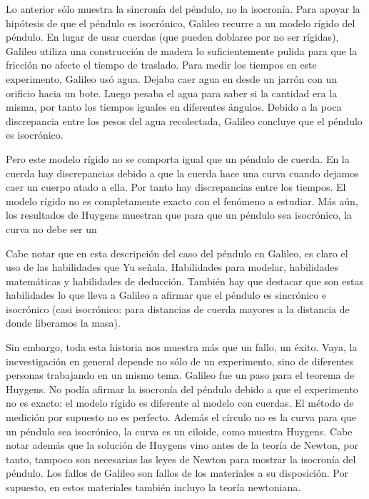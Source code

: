 Lo anterior sólo muestra la sincronía del péndulo, no la isocronía. Para apoyar la hipótesis de que el péndulo es isocrónico, Galileo recurre a un modelo rígido del péndulo. En lugar de usar cuerdas (que pueden doblarse por no ser rígidas), Galileo utiliza una construcción de madera lo suficientemente pulida para que la fricción no afecte el tiempo de traslado. Para medir los tiempos en este experimento, Galileo usó agua. Dejaba caer agua en desde un jarrón con un orificio hacia un bote. Luego pesaba el agua para saber si la cantidad era la misma, por tanto los tiempos iguales en diferentes ángulos. Debido a la poca discrepancia entre los pesos del agua recolectada, Galileo concluye que el péndulo es isocrónico.

Pero este modelo rígido no se comporta igual que un péndulo de cuerda. En la cuerda hay discrepancias debido a que la cuerda hace una curva cuando dejamos caer un cuerpo atado a ella. Por tanto hay discrepancias entre los tiempos. El modelo rígido no es completamente exacto con el fenómeno a estudiar. Más aún, los resultados de Huygens muestran que para que un péndulo sea isocrónico, la curva no debe ser un %

Cabe notar que en esta descripción del caso del péndulo en Galileo, es claro el uso de las habilidades que Yu señala. Habilidades para modelar, habilidades matemáticas y habilidades de deducción. También hay que destacar que son estas habilidades lo que lleva a Galileo a afirmar que el péndulo es sincrónico e isocrónico (casi isocrónico: para distancias de cuerda mayores a la distancia de donde liberamos la masa).

Sin embargo, toda esta historia nos muestra más que un fallo, un éxito. Vaya, la incvestigación en general depende no sólo de un experimento, sino de diferentes personas trabajando en un mismo tema. Galileo fue un paso para el teorema de Huygens. No podía afirmar la isocronía del péndulo debido a que el experimento no es exacto: el modelo rígido es diferente al modelo con cuerdas. El método de medición por supuesto no es perfecto. Además el círculo no es la curva para que un péndulo sea isocrónico, la curva es un ciloide, como muestra Huygens. Cabe notar además que la solución de Huygens vino antes de la teoría de Newton, por tanto, tampoco son necesarias las leyes de Newton para mostrar la isocronía del péndulo. Los fallos de Galileo son fallos de los materiales a su disposición. Por supuesto, en estos materiales también incluyo la teoría newtoniana.

